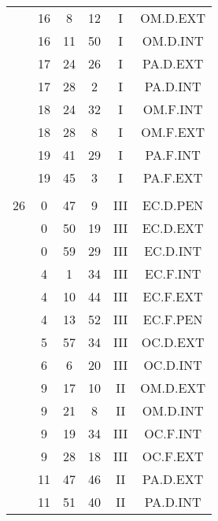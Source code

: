 \documentclass[12pt, a4paper]{article}
\begin{document}
\begin{multicols}{3}
{\begin{tabular}{c c c c c c}
	 	 	 	 & 16 & 8 & 12 & I & OM.D.EXT\\%
	 	 	 	 & 16 & 11 & 50 & I & OM.D.INT\\%
	 	 	 	 & 17 & 24 & 26 & I & PA.D.EXT\\%
	 	 	 	 & 17 & 28 & 2 & I & PA.D.INT\\%
	 	 	 	 & 18 & 24 & 32 & I & OM.F.INT\\%
	 	 	 	 & 18 & 28 & 8 & I & OM.F.EXT\\%
	 	 	 	 & 19 & 41 & 29 & I & PA.F.INT\\%
	 	 	 	 & 19 & 45 & 3 & I & PA.F.EXT\\%
	 	 	 	 & & & & & \\%
	 	 	 	26 & 0 & 47 & 9 & III & EC.D.PEN\\%
	 	 	 	 & 0 & 50 & 19 & III & EC.D.EXT\\%
	 	 	 	 & 0 & 59 & 29 & III & EC.D.INT\\%
	 	 	 	 & 4 & 1 & 34 & III & EC.F.INT\\%
	 	 	 	 & 4 & 10 & 44 & III & EC.F.EXT\\%
	 	 	 	 & 4 & 13 & 52 & III & EC.F.PEN\\%
	 	 	 	 & 5 & 57 & 34 & III & OC.D.EXT\\%
	 	 	 	 & 6 & 6 & 20 & III & OC.D.INT\\%
	 	 	 	 & 9 & 17 & 10 & II & OM.D.EXT\\%
	 	 	 	 & 9 & 21 & 8 & II & OM.D.INT\\%
	 	 	 	 & 9 & 19 & 34 & III & OC.F.INT\\%
	 	 	 	 & 9 & 28 & 18 & III & OC.F.EXT\\%
	 	 	 	 & 11 & 47 & 46 & II & PA.D.EXT\\%
	 	 	 	 & 11 & 51 & 40 & II & PA.D.INT\\%

\end{tabular}}
\end{multicols}
\end{document}
